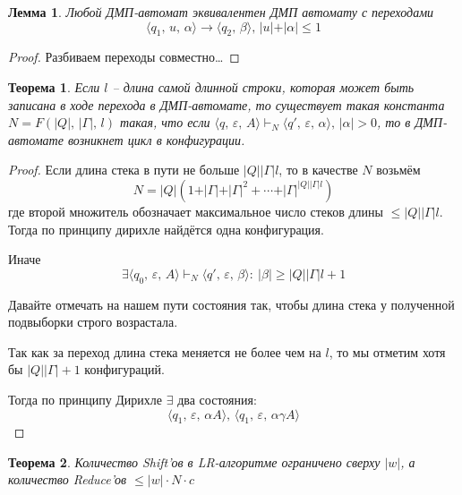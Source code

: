 \documentclass[a4paper,12pt]{article}
\renewcommand{\leq}{\ensuremath{\leqslant}}
\renewcommand{\geq}{\ensuremath{\geqslant}}
\theoremstyle{plain}
\newtheorem{theorem}{Теорема}[subsection]
\newtheorem{lemma}{Лемма}[subsection]
\theoremstyle{definition}
\theoremstyle{remark}
\begin{document}
\begin{lemma}
	Любой ДМП-автомат эквивалентен ДМП автомату с переходами
	\[
		\langle q_1,\,u,\,\alpha\rangle\to\langle q_2,\,\beta\rangle,\, \vert u\vert +\vert \alpha\vert \leq 1
	\]
\end{lemma}

\begin{proof}
	Разбиваем переходы совместно\dots
\end{proof}

\begin{theorem}
	Если $l$ -- длина самой длинной строки, которая может быть записана в ходе перехода в ДМП-автомате, то существует такая константа $N = F(\vert Q\vert,\, \vert \Gamma\vert,\, l)$ такая, что если $\langle q,\,\varepsilon,\, A\rangle \vdash_N\langle q',\,\varepsilon,\, \alpha\rangle,\, \vert \alpha\vert > 0$, то в ДМП-автомате возникнет цикл в конфигурации.
\end{theorem}

\begin{proof}
	Если длина стека в пути не больше $\vert Q\vert\vert\Gamma\vert l$, то в качестве $N$ возьмём
	\[
		N = \vert Q\vert(1 + \vert \Gamma\vert + \vert\Gamma\vert^2 +\cdots + \vert\Gamma\vert^{\vert Q\vert\vert\Gamma\vert l})
	\]
	где второй множитель обозначает максимальное число стеков длины $\leq \vert Q\vert\vert\Gamma\vert l$. Тогда по принципу дирихле найдётся одна конфигурация.

	Иначе
	\[
		\exists \langle q_0,\,\varepsilon,\,A\rangle\vdash_N\langle q',\,\varepsilon,\,\beta\rangle :\: \vert\beta\vert \geq \vert Q\vert\vert\Gamma\vert l + 1
	\]

	Давайте отмечать на нашем пути состояния так, чтобы длина стека у полученной подвыборки строго возрастала.

	Так как за переход длина стека меняется не более чем на $l$, то мы отметим хотя бы $\vert Q\vert\vert\Gamma\vert +1$ конфигураций.

	Тогда по принципу Дирихле $\exists$ два состояния:
	\[
		\langle q_1,\, \varepsilon,\, \alpha A\rangle,\,\langle q_1,\, \varepsilon,\, \alpha\gamma A\rangle
	\]
\end{proof}

\begin{theorem}
	Количество Shift'ов в LR-алгоритме ограничено сверху $\vert w\vert$, а количество Reduce'ов $\leq \vert w\vert\cdot N\cdot c$
\end{theorem}
\end{document}

